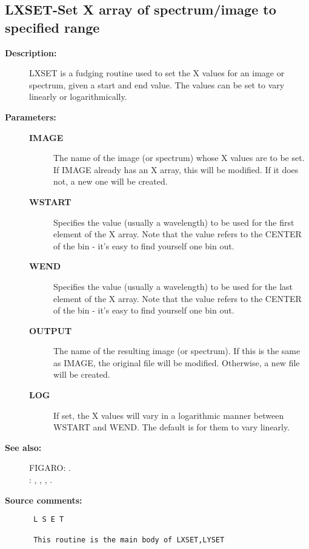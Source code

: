 \subsection{LXSET-\label{LXSET}Set X array of spectrum/image to specified range}
\begin{description}

\item [{\bf Description:}]
 LXSET is a fudging routine used to set the X values for an image
 or spectrum, given a start and end value.  The values can be set
 to vary linearly or logarithmically.

\item [{\bf Parameters:}]
\begin{description}
\item [{\bf IMAGE}]
 The name of the image (or spectrum) whose
 X values are to be set.  If IMAGE already has an X
 array, this will be modified.  If it does not, a new
 one will be created.
\item [{\bf WSTART}]
 Specifies the value (usually a wavelength)
 to be used for the first element of the X array.
 Note that the value refers to the CENTER of the
 bin - it's easy to find yourself one bin out.
\item [{\bf WEND}]
 Specifies the value (usually a wavelength)
 to be used for the last element of the X array.
 Note that the value refers to the CENTER of the
 bin - it's easy to find yourself one bin out.
\item [{\bf OUTPUT}]
 The name of the resulting image (or spectrum).
 If this is the same as IMAGE, the original
 file will be modified.  Otherwise, a new file
 will be created.
\item [{\bf LOG}]
 If set, the X values will vary in a logarithmic
 manner between WSTART and WEND.  The default is
 for them to vary linearly.
\end{description}

\item [{\bf See also:}]
FIGARO: .\\
: , , , .\\

\item [{\bf Source comments:}]
\begin{verbatim}
 L S E T

 This routine is the main body of LXSET,LYSET


\end{verbatim}
\end{description}
